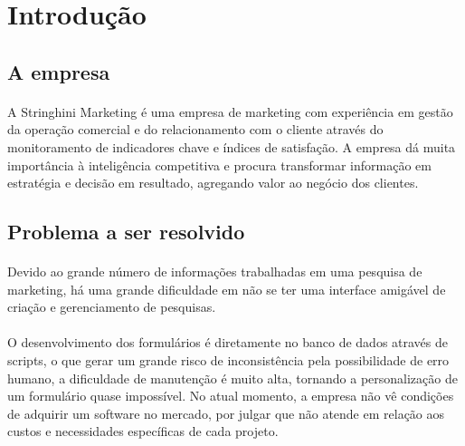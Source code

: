 \documentclass[11pt]{article}
\begin{document}
  \newpage

  \section{Introdução}
  
    \subsection{A empresa}

      \paragraph{}
      
      A Stringhini Marketing é uma empresa de marketing com experiência 
      em gestão da operação comercial e do relacionamento com o cliente 
      através do monitoramento de indicadores chave e índices de 
      satisfação. A empresa dá muita importância à inteligência 
      competitiva e procura transformar informação em estratégia e 
      decisão em resultado, agregando valor ao negócio dos clientes.
      
    \subsection{Problema a ser resolvido}

      \paragraph{}

      Devido ao grande número de informações trabalhadas em uma pesquisa 
      de marketing, há uma grande dificuldade em não se ter uma 
      interface amigável de criação e gerenciamento de pesquisas.
      
      \paragraph{}
      
      O desenvolvimento dos formulários é diretamente no banco de 
      dados através de scripts, o que gerar um grande risco de 
      inconsistência pela possibilidade de erro humano, a dificuldade de 
      manutenção é muito alta, tornando a personalização de um 
      formulário quase impossível. No atual momento, a empresa não vê 
      condições de adquirir um software no mercado, por julgar que não 
      atende em relação aos custos e necessidades específicas de cada 
      projeto.
      
\end{document}
